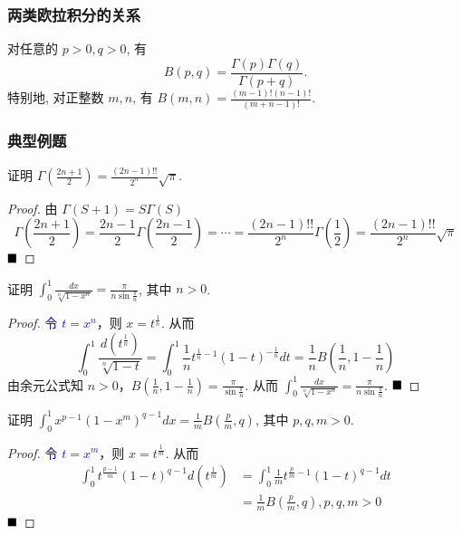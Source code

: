 \documentclass[lang=cn,newtx,10pt,scheme=chinese]{elegantbook}
\begin{document}
\subsubsection{两类欧拉积分的关系}

\begin{theorem*}
对任意的 $p>0, q>0$, 有
$$ B(p, q) = \frac{\Gamma(p)\Gamma(q)}{\Gamma(p+q)}. $$
特别地, 对正整数 $m, n$, 有 $B(m, n) = \frac{(m-1)!(n-1)!}{(m+n-1)!}$.
\end{theorem*}

\subsubsection{典型例题}
\begin{example}
证明 $\Gamma\left(\frac{2n+1}{2}\right) = \frac{(2n-1)!!}{2^n}\sqrt{\pi}$.
\end{example}

\begin{proof}
由 $\Gamma(S+1)=S\Gamma(S)$
$$ \Gamma(\frac{2n+1}{2}) = \frac{2n-1}{2}\Gamma(\frac{2n-1}{2}) = \cdots = \frac{(2n-1)!!}{2^n}\Gamma(\frac{1}{2}) = \frac{(2n-1)!!}{2^n}\sqrt{\pi} $$
$\hfill \blacksquare$
\end{proof}

\begin{example}
证明 $\int_0^1 \frac{dx}{\sqrt[n]{1-x^n}} = \frac{\pi}{n\sin\frac{\pi}{n}}$, 其中 $n > 0$.
\end{example}

\begin{proof}
\textcolor{blue}{令 $t=x^n$}，则 $x=t^{\frac{1}{n}}$. 从而 
$$
\int_0^1 \frac{d(t^{\frac{1}{n}})}{\sqrt[n]{1-t}} = \int_0^1 \frac{1}{n}t^{\frac{1}{n}-1}(1-t)^{-\frac{1}{n}}dt = \frac{1}{n}B(\frac{1}{n}, 1-\frac{1}{n})
$$
由余元公式知 $n>0$，$B(\frac{1}{n}, 1-\frac{1}{n}) = \frac{\pi}{\sin\frac{\pi}{n}}$.
从而 $\int_0^1 \frac{dx}{\sqrt[n]{1-x^n}} = \frac{\pi}{n\sin\frac{\pi}{n}}$.
$\hfill \blacksquare$
\end{proof}

\begin{example}
证明 $\int_0^1 x^{p-1}(1-x^m)^{q-1} dx = \frac{1}{m}B\left(\frac{p}{m}, q\right)$, 其中 $p,q,m > 0$.
\end{example}

\begin{proof}
\textcolor{blue}{令 $t=x^m$}，则 $x=t^{\frac{1}{m}}$. 从而
\begin{align*}
\int_0^1 t^{\frac{p-1}{m}}(1-t)^{q-1}d(t^{\frac{1}{m}}) &= \int_0^1 \frac{1}{m}t^{\frac{p}{m}-1}(1-t)^{q-1}dt \\
&= \frac{1}{m}B(\frac{p}{m},q), p,q,m>0
\end{align*}
$\hfill \blacksquare$
\end{proof}
\end{document}
